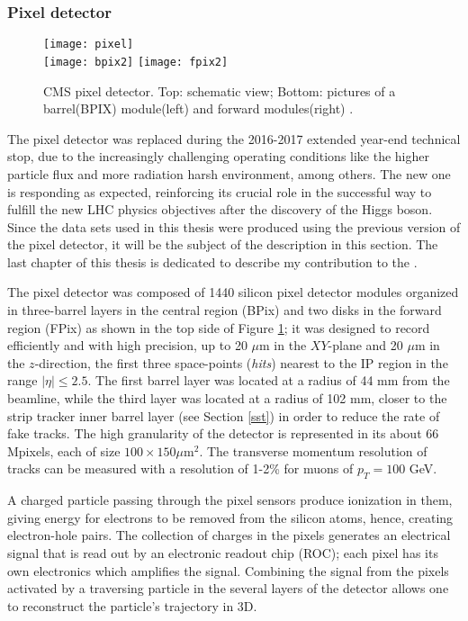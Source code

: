 \subsubsection*{Pixel detector}


\begin{figure}[h!]
  \centering
  \texttt{[image: pixel]}\\
  \texttt{[image: bpix2]}
  \texttt{[image: fpix2]}
  \caption[CMS pixel detector]{CMS pixel detector. Top: schematic view; Bottom: pictures of a barrel(BPIX) module(left) and forward modules(right) \cite{cms}.}
  \label{fig:pixel_det}
\end{figure}

The pixel detector was replaced during the 2016-2017 extended year-end technical stop, due to the increasingly challenging operating conditions like the higher particle flux and more radiation harsh environment, among others. The new one is responding as expected, reinforcing its crucial role in the successful way to fulfill the new LHC physics objectives after the discovery of the Higgs boson. Since the data sets used in this thesis were produced using the previous version of the pixel detector, it will be the subject of the description in this section. The last chapter of this thesis is dedicated to describe my contribution to the .

The pixel detector was composed of 1440 silicon pixel detector modules organized in three-barrel layers in the central region (BPix) and two disks in the forward region (FPix) as shown in the top side of Figure \ref{fig:pixel_det}; it was designed to record efficiently and with high precision, up to 20 $\mu$m in the $XY$-plane and 20 $\mu$m in the $z$-direction, the first three space-points (\textit{hits}) nearest to the IP region in the range $|\eta|\leq 2.5$. The first barrel layer was located at a radius of 44 mm from the beamline, while the third layer was located at a radius of 102 mm, closer to the strip tracker inner barrel layer (see Section \ref{sst}) in order to reduce the rate of fake tracks. The high granularity of the detector is represented in its about 66 Mpixels, each of size $100\times150 \mu$m$^2$. The transverse momentum resolution of tracks can be measured with a resolution of 1-2\% for muons of $p_T=100$ GeV. 

A charged particle passing through the pixel sensors produce ionization in them, giving energy for electrons to be removed from the silicon atoms, hence, creating electron-hole pairs. The collection of charges in the pixels generates an electrical signal that is read out by an electronic readout chip (ROC); each pixel has its own electronics which amplifies the signal. Combining the signal from the pixels activated by a traversing particle in the several layers of the detector allows one to reconstruct the particle's trajectory in 3D.

